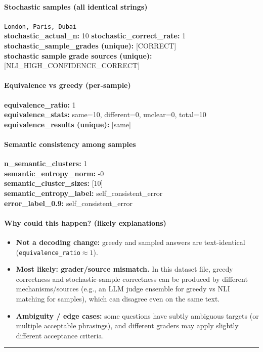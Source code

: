 \documentclass[11pt]{article}
\newcommand{\mono}[1]{\texttt{#1}}
\begin{document}
\paragraph{Stochastic samples (all identical strings)}
\mono{London, Paris, Dubai}\\
\textbf{stochastic\_actual\_n:} 10 \quad \textbf{stochastic\_correct\_rate:} 1\\
\textbf{stochastic\_sample\_grades (unique):} [CORRECT]\\
\textbf{stochastic sample grade sources (unique):} [NLI\_HIGH\_CONFIDENCE\_CORRECT]\\
\paragraph{Equivalence vs greedy (per-sample)}
\textbf{equivalence\_ratio:} 1\\
\textbf{equivalence\_stats:} same=10, different=0, unclear=0, total=10\\
\textbf{equivalence\_results (unique):} [same]\\
\paragraph{Semantic consistency among samples}
\textbf{n\_semantic\_clusters:} 1\\
\textbf{semantic\_entropy\_norm:} -0\\
\textbf{semantic\_cluster\_sizes:} [10]\\
\textbf{semantic\_entropy\_label:} self\_consistent\_error\\
\textbf{error\_label\_0.9:} self\_consistent\_error\\
\paragraph{Why could this happen? (likely explanations)}
\begin{itemize}\item \textbf{Not a decoding change:} greedy and sampled answers are text-identical (\mono{equivalence\_ratio}$\approx 1$).\item \textbf{Most likely: grader/source mismatch.} In this dataset file, greedy correctness and stochastic-sample correctness can be produced by different mechanisms/sources (e.g., an LLM judge ensemble for greedy vs NLI matching for samples), which can disagree even on the same text.\item \textbf{Ambiguity / edge cases:} some questions have subtly ambiguous targets (or multiple acceptable phrasings), and different graders may apply slightly different acceptance criteria.\end{itemize}
\vspace{10pt}
\hrule
\vspace{10pt}
\end{document}
